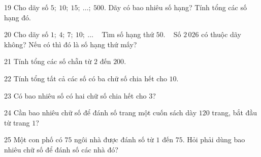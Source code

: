 \gap
\begin{probbox}{19}{\relax}
Cho dãy số $5;\ 10;\ 15;\ \dots;\ 500$. Dãy có bao nhiêu số hạng? Tính tổng các số hạng đó.
\end{probbox}
\gap
\begin{probbox}{20}{\relax}
Cho dãy số $1;\ 4;\ 7;\ 10;\ \dots$ \  Tìm số hạng thứ $50$. \  Số $2\,026$ có thuộc dãy không? Nếu có thì đó là số hạng thứ mấy?
\end{probbox}
\gap
\begin{probbox}{21}{\relax}
Tính tổng các số chẵn từ $2$ đến $200$.
\end{probbox}
\gap
\begin{probbox}{22}{\relax}
Tính tổng tất cả các số có ba chữ số chia hết cho $10$.
\end{probbox}
\gap
\begin{probbox}{23}{\relax}
Có bao nhiêu số có hai chữ số chia hết cho $3$?
\end{probbox}
\gap
\begin{probbox}{24}{\relax}
Cần bao nhiêu chữ số để đánh số trang một cuốn sách dày $120$ trang, bắt đầu từ trang $1$?
\end{probbox}
\gap
\begin{probbox}{25}{\relax}
Một con phố có $75$ ngôi nhà được đánh số từ $1$ đến $75$. Hỏi phải dùng bao nhiêu chữ số để đánh số các nhà đó?
\end{probbox}
